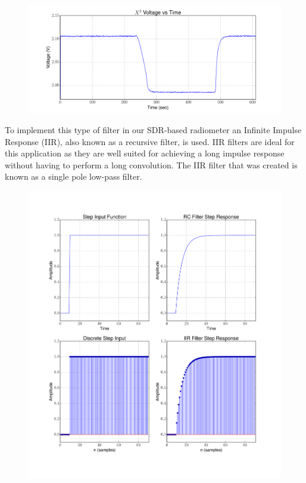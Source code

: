 {\begin{figure}[h!tb] 
\centering
\includegraphics[width=17cm]{Experiments/Exp1/x2_filter.pdf}
\label{square_raw_filt}
\end{figure}
}

To implement this type of filter in our SDR-based radiometer an Infinite Impulse Response (IIR), also known as a recursive filter, is used.  IIR filters are ideal for this application as they are well suited for achieving a long impulse response without having to perform a long convolution.  The IIR filter that was created is known as a single pole low-pass filter.  

{\begin{figure}[h!tb] 
\centering
\includegraphics[width=12.4cm]{Experiments/Exp6/all_four.pdf}
\label{rc_response}
\end{figure}
}

